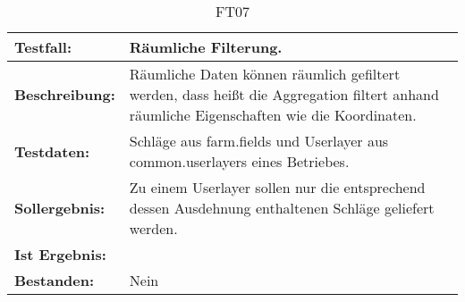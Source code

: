 \begin{table}[h!]
\centering
\small
\begin{tabular}{p{2.8cm}|p{12cm}}
\textbf{Testfall:} & Räumliche Filterung. \\ \hline
\textbf{Beschreibung:} & Räumliche Daten können räumlich gefiltert werden, dass heißt die Aggregation filtert anhand räumliche Eigenschaften wie die Koordinaten. \\ \hline
\textbf{Testdaten:} & Schläge aus farm.fields und Userlayer aus common.userlayers eines Betriebes. \\ \hline
\textbf{Sollergebnis:} & Zu einem Userlayer sollen nur die entsprechend dessen Ausdehnung enthaltenen Schläge geliefert werden. \\ \hline
\textbf{Ist Ergebnis:} &  \\ \hline
\textbf{Bestanden:} & Nein \\
\end{tabular}
\caption*{FT07}
\end{table}

\capstarttrue
\newpage